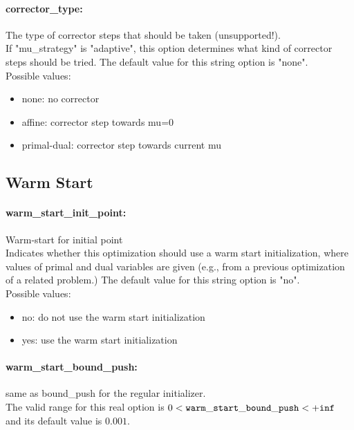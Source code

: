 \paragraph{corrector\_type:}\label{sec:corrector_type} The type of corrector steps that should be taken (unsupported!). $\;$ \\
 If "mu\_strategy" is "adaptive", this option
determines what kind of corrector steps should be
tried.
The default value for this string option is "none".
\\ 
Possible values:
\begin{itemize}
   \item none: no corrector
   \item affine: corrector step towards mu=0
   \item primal-dual: corrector step towards current mu
\end{itemize}

\subsection{Warm Start}

\paragraph{warm\_start\_init\_point:}\label{sec:warm_start_init_point} Warm-start for initial point $\;$ \\
 Indicates whether this optimization should use a
warm start initialization, where values of primal
and dual variables are given (e.g., from a
previous optimization of a related problem.)
The default value for this string option is "no".
\\ 
Possible values:
\begin{itemize}
   \item no: do not use the warm start initialization
   \item yes: use the warm start initialization
\end{itemize}

\paragraph{warm\_start\_bound\_push:}\label{sec:warm_start_bound_push} same as bound\_push for the regular initializer. $\;$ \\
 The valid range for this real option is 
$0 <  {\tt warm\_start\_bound\_push } <  {\tt +inf}$
and its default value is $0.001$.


